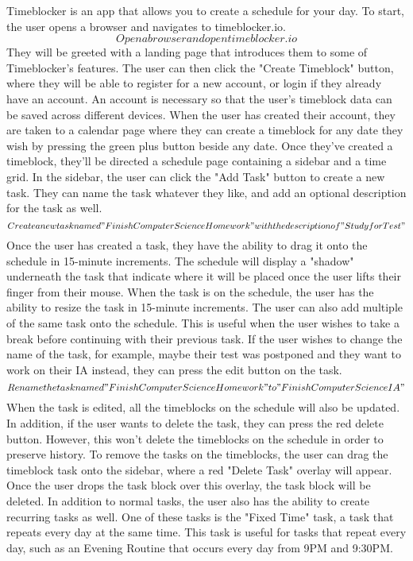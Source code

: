 \documentclass[notitlepage]{report}
\begin{document}
Timeblocker is an app that allows you to create a schedule for your day.
To start, the user opens a browser and navigates to timeblocker.io.
\[Open a browser and open timeblocker.io\]
They will be greeted with a landing page that introduces them to some of Timeblocker's features.
The user can then click the "Create Timeblock" button, where they will be able to register for a new account, or login if they already have an account.
An account is necessary so that the user's timeblock data can be saved across different devices.
When the user has created their account, they are taken to a calendar page where they can create a timeblock for any date they wish by pressing the green plus button beside any date.
Once they've created a timeblock, they'll be directed a schedule page containing a sidebar and a time grid. In the sidebar, the user can click the "Add Task" button to create a new task. They can name the task whatever they like, and add an optional description for the task as well.
\[Create a new task named "Finish Computer Science Homework" with the description of "Study for Test" \]
Once the user has created a task, they have the ability to drag it onto the schedule in 15-minute increments. The schedule will display a "shadow" underneath the task that indicate where it will be placed once the user lifts their finger from their mouse. When the task is on the schedule, the user has the ability to resize the task in 15-minute increments.
The user can also add multiple of the same task onto the schedule. This is useful when the user wishes to take a break before continuing with their previous task.
If the user wishes to change the name of the task, for example, maybe their test was postponed and they want to work on their IA instead, they can press the edit button on the task.
\[Rename the task named "Finish Computer Science Homework" to "Finish Computer Science IA"\]
When the task is edited, all the timeblocks on the schedule will also be updated.
In addition, if the user wants to delete the task, they can press the red delete button. However, this won't delete the timeblocks on the schedule in order to preserve history. To remove the tasks on the timeblocks, the user can drag the timeblock task onto the sidebar, where a red "Delete Task" overlay will appear. Once the user drops the task block over this overlay, the task block will be deleted.
In addition to normal tasks, the user also has the ability to create recurring tasks as well. One of these tasks is the "Fixed Time" task, a task that repeats every day at the same time. This task is useful for tasks that repeat every day, such as an Evening Routine that occurs every day from 9PM and 9:30PM.
\end{document}
